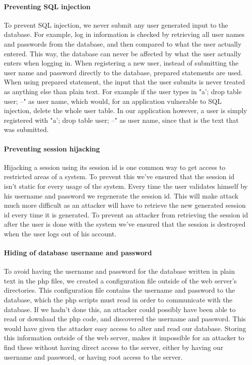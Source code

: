 \documentclass[11pt, a4paper]{article}
\begin{document}
\paragraph{Preventing SQL injection}
To prevent SQL injection, we never submit any user generated input to the database. For example, log in information is checked by retrieving all user names and passwords from the database, and then compared to what the user actually entered. This way, the database can never be affected by what the user actually enters when logging in.
When registering a new user, instead of submitting the user name and password directly to the database, prepared statements are used. When using prepared statement, the input that the user submits is never treated as anything else than plain text. For example if the user types in "a'; drop table user; --" as user name, which would, for an application vulnerable to SQL injection, delete the whole user table. In our application however, a user is simply registered with "a'; drop table user; --" as user name, since that is the text that was submitted.
\paragraph{Preventing session hijacking}
Hijacking a session using its session id is one common way to get access to restricted areas of a system. To prevent this we've ensured that the session id isn't static for every usage of the system. Every time the user validates himself by his username and password we regenerate the session id. This will make attack much more difficult as an attacker will have to retrieve the new generated session id every time it is generated. To prevent an attacker from retrieving the session id after the user is done with the system we've ensured that the session is destroyed when the user logs out of his account. 
\paragraph{Hiding of database username and password}
To avoid having the username and password for the database written in plain text in the php files, we created a configuration file outside of the web server's directories. This configuration file contains the username and password to the database, which the php scripts must read in order to communicate with the database. If we hadn't done this, an attacker could possibly have been able to read or download the php code, and discovered the username and password. This would have given the attacker easy access to alter and read our database. Storing this information outside of the web server, makes it impossible for an attacker to find these without having direct access to the server, either by having our username and password, or having root access to the server. 
\end{document}

